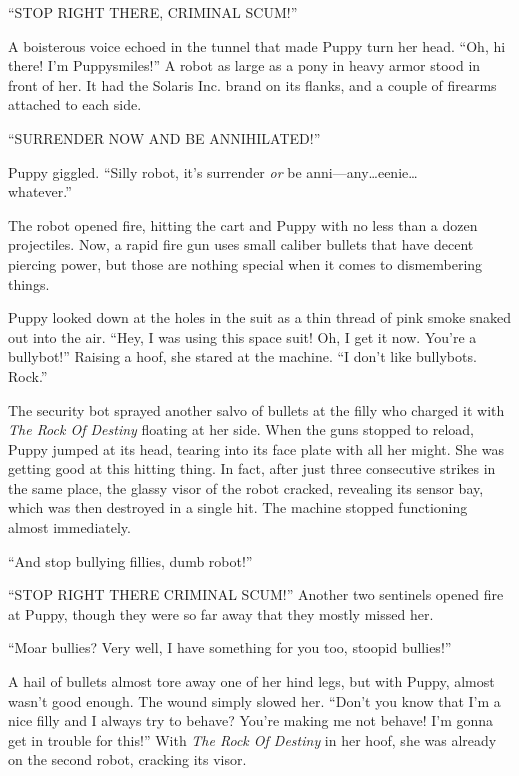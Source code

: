 ``STOP RIGHT THERE, CRIMINAL SCUM!''

A boisterous voice echoed in the tunnel that made Puppy turn her head. ``Oh, hi there! I'm Puppysmiles!'' A robot as large as a pony in heavy armor stood in front of her. It had the Solaris Inc. brand on its flanks, and a couple of firearms attached to each side.

``SURRENDER NOW AND BE ANNIHILATED!''


Puppy giggled. ``Silly robot, it's surrender \emph{or} be anni---any\dots eenie\dots\\ whatever.''


The robot opened fire, hitting the cart and Puppy with no less than a dozen projectiles. Now, a rapid fire gun uses small caliber bullets that have decent piercing power, but those are nothing special when it comes to dismembering things.

Puppy looked down at the holes in the suit as a thin thread of pink smoke snaked out into the air. ``Hey, I was using this space suit! Oh, I get it now. You're a bullybot!'' Raising a hoof, she stared at the machine. ``I don't like bullybots. Rock.''

The security bot sprayed another salvo of bullets at the filly who charged it with \emph{The Rock Of Destiny} floating at her side. When the guns stopped to reload, Puppy jumped at its head, tearing into its face plate with all her might. She was getting good at this hitting thing. In fact, after just three consecutive strikes in the same place, the glassy visor of the robot cracked, revealing its sensor bay, which was then destroyed in a single hit. The machine stopped functioning almost immediately.

``And stop bullying fillies, dumb robot!''

``STOP RIGHT THERE CRIMINAL SCUM!'' Another two sentinels opened fire at Puppy, though they were so far away that they mostly missed her.

``Moar bullies? Very well, I have something for you too, stoopid bullies!''

A hail of bullets almost tore away one of her hind legs, but with Puppy, almost wasn't good enough. The wound simply slowed her. ``Don't you know that I'm a nice filly and I always try to behave? You're making me not behave! I'm gonna get in trouble for this!'' With \emph{The Rock Of Destiny} in her hoof, she was already on the second robot, cracking its visor.

